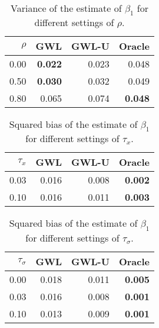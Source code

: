 \documentclass[authoryear, review, 11pt]{elsarticle}
\begin{document}
\begin{table}[ht]
\begin{center}
\begin{tabular}{rrrr}
 $\rho$ & GWL & GWL-U & Oracle \\ 
  \hline
0.00 & \textbf{0.022} & 0.023 & 0.048 \\ 
  0.50 & \textbf{0.030} & 0.032 & 0.049 \\ 
  0.80 & 0.065 & 0.074 & \textbf{0.048} \\ 
  \end{tabular}
\caption{Variance of the estimate of $\beta_1$ for different settings of $\rho$.}
\end{center}
\end{table}


\begin{table}[ht]
\begin{center}
\begin{tabular}{rrrr}
 $\tau_x$ & GWL & GWL-U & Oracle \\ 
  \hline
0.03 & 0.016 & 0.008 & \textbf{0.002} \\ 
  0.10 & 0.016 & 0.011 & \textbf{0.003} \\ 
  \end{tabular}
\caption{Squared bias of the estimate of $\beta_1$ for different settings of $\tau_x$.}
\end{center}
\end{table}

\begin{table}[ht]
\begin{center}
\begin{tabular}{rrrr}
 $\tau_\sigma$ & GWL & GWL-U & Oracle \\ 
  \hline
0.00 & 0.018 & 0.011 & \textbf{0.005} \\ 
  0.03 & 0.016 & 0.008 & \textbf{0.001} \\ 
  0.10 & 0.013 & 0.009 & \textbf{0.001} \\ 
  \end{tabular}
\caption{Squared bias of the estimate of $\beta_1$ for different settings of $\tau_\sigma$.}
\end{center}
\end{table}
\end{document}
